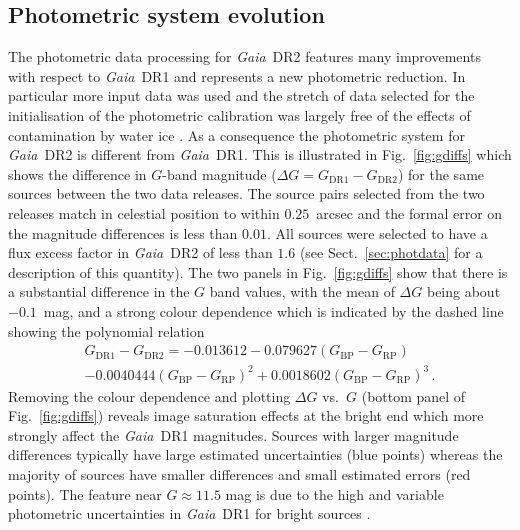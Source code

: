 \documentclass[longauth]{aa_gaia} %
\newcommand\gaia{\textit{Gaia}}
\newcommand\gdr[1]{\gaia~DR#1}
\newcommand\secref[1]{Sect.~\ref{#1}}
\newcommand\figref[1]{Fig.~\ref{#1}}
\newcommand\gbp{\ensuremath{G_\mathrm{BP}}}
\newcommand\grp{\ensuremath{G_\mathrm{RP}}}
\begin{document}
\subsection{Photometric system evolution}

The photometric data processing for \gdr{2} \citep{DR2-DPACP-44,DR2-DPACP-40} features many improvements
with respect to \gdr{1} and represents a new photometric reduction. In particular more input data
was used and the stretch of data selected for the initialisation of the photometric calibration was
largely free of the effects of contamination by water ice \citep[see][for a summary of the
contamination problem in the early phases of the {\gaia} mission]{2016A&A...595A...1G}. As a
consequence the photometric system for \gdr{2} is different from \gdr{1}. This is illustrated in
\figref{fig:gdiffs} which shows the difference in $G$-band magnitude ($\Delta
G=G_\mathrm{DR1}-G_\mathrm{DR2}$) for the same sources between the two data releases. The source
pairs selected from the two releases match in celestial position to within $0.25$~arcsec and the
formal error on the magnitude differences is less than $0.01$. All sources were selected to have a
flux excess factor in \gdr{2} of less than $1.6$ (see \secref{sec:photdata} for a description of this
quantity). The two panels in \figref{fig:gdiffs} show that there is a substantial difference in the
$G$ band values, with the mean of $\Delta G$ being about $-0.1$~mag, and a strong colour dependence
which is indicated by the dashed line showing the polynomial relation
\begin{multline}
  G_\mathrm{DR1}-G_\mathrm{DR2} = 
  -0.013612 - 0.079627(\gbp-\grp) \\ - 0.0040444(\gbp-\grp)^2 +
  0.0018602(\gbp-\grp)^3\,.
  \label{eq:diffgvsbpminrp}
\end{multline}
Removing the colour dependence and plotting $\Delta G$ vs.\ $G$ (bottom panel of
\figref{fig:gdiffs}) reveals image saturation effects at the bright end which more strongly affect
the \gdr{1} magnitudes. Sources with larger magnitude differences typically have large estimated
uncertainties (blue points) whereas the majority of sources have smaller differences and small
estimated errors (red points). The feature near $G\approx11.5$ mag is due to the high and variable
photometric uncertainties in \gdr{1} for bright sources \citep[see figure 9 in][]{DR2-DPACP-40}.
\end{document}
